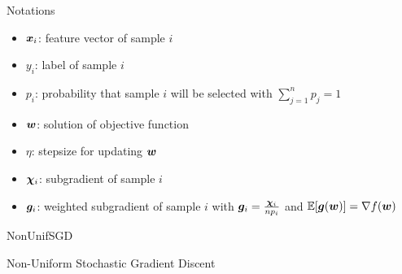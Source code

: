 \begin{frame}{Notations}
\begin{itemize}
\item $\bm{x}_i$: feature vector of sample $i$
\item $y_i$: label of sample $i$
\item $p_i$: probability that sample $i$ will be selected with $\sum_{j=1}^n p_j=1$
\item $\bm{w}$: solution of objective function
\item $\eta$: stepsize for updating $\bm{w}$
\item $\bm{\chi}_i$: subgradient of sample $i$
\item $\bm{g}_i$: weighted subgradient of sample $i$ with $\bm{g}_i = \frac{\bm{\chi}_i}{n p_i}$ and $\mathbb{E}[\bm{g}(\bm{w})] = \nabla f(\bm{w})$
\end{itemize}
\end{frame}
\begin{frame}{NonUnifSGD}
\begin{algorithm}[H]
    \label{alg:SGD}
    \caption{Non-Uniform Stochastic Gradient Discent}
    \SetAlgoLined
\end{algorithm}
\end{frame}


